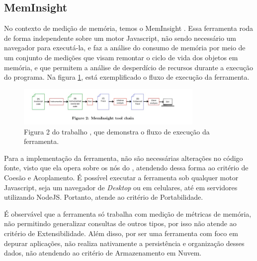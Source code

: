 \documentclass[12pt]{tcc}
\begin{document}
	\subsection{MemInsight}
	\label{subsection:meminsight}

	No contexto de medição de memória, temos o MemInsight \citep{Jensen2015MemInsight}. Essa ferramenta roda de forma independente sobre um motor Javascript, não sendo necessário um navegador para executá-la, e faz a análise do consumo de memória por meio de um conjunto de medições que visam remontar o ciclo de vida dos objetos em memória, e que permitem a análise de desperdício de recursos durante a execução do programa. Na figura \ref{fig:meminsight}, está exemplificado o fluxo de execução da ferramenta.

	\begin{figure}[!ht]
		\centering
		\includegraphics[width=0.8\textwidth]{figures/meminsight.jpeg}
		\caption[Fluxo da ferramenta MemInsight]{Figura 2 do trabalho \citep{Jensen2015MemInsight}, que demonstra o fluxo de execução da ferramenta. }
		\label{fig:meminsight}
	\end{figure}

	Para a implementação da ferramenta, não são necessárias alterações no código fonte, visto que ela opera sobre os nós do , atendendo dessa forma ao critério de Coesão e Acoplamento. É possível executar a ferramenta sob qualquer motor Javascript, seja um navegador de \emph{Desktop} ou em celulares, até em servidores utilizando NodeJS. Portanto, atende ao critério de Portabilidade.

	É observável que a ferramenta só trabalha com medição de métricas de memória, não permitindo generalizar consultas de outros tipos, por isso não atende ao critério de Extensibilidade. Além disso, por ser uma ferramenta com foco em depurar aplicações, não realiza nativamente a persistência e organização desses dados, não atendendo ao critério de Armazenamento em Nuvem.		
\end{document}
